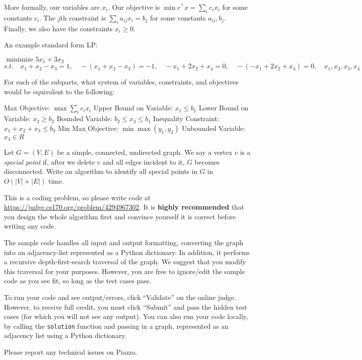 \documentclass{article}
\begin{document}
More formally, our variables are $x_i$. Our objective is $\min c^\top x = \sum_i c_i x_i$ for some constants $c_i$. The $j$th constraint is  $\sum_i a_{ij} x_i = b_j$ for some constants $a_{ij}, b_j$. Finally, we also have the constraints $x_i \geq 0$.

An example standard form LP: 
\begin{center}
$\mbox{ minimize } 5x_1 + 3x_2$\\
$s.t.\quad x_1 + x_2 - x_3 = 1, \quad -(x_1 + x_2 - x_3) = -1, \quad -x_1 + 2x_2 + x_4 = 0, \quad -(-x_1 + 2x_2 + x_4) = 0, \quad x_1, x_2, x_3, x_4 \ge 0$
\end{center} 

For each of the subparts, what system of variables, constraints, and objectives would be equivalent to the following:
\begin{subparts}
  \subpart Max Objective: $\max \sum_i c_i x_i$
  \subpart Upper Bound on Variable: $x_1 \leq b_1$
  \subpart Lower Bound on Variable: $x_2 \geq b_2$
  \subpart Bounded Variable: $b_2 \leq x_3 \leq b_1$
  \subpart Inequality Constraint: $x_1 + x_2 + x_3 \leq b_3$
  \subpart Min Max Objective: $\min \max (y_1,y_2)$
  \subpart Unbounded Variable: $x_4 \in R$
\end{subparts}


Let $G=(V, E)$ be a simple, connected, undirected graph. We say a vertex $v$ is a \emph{special point} if, after we delete $v$ and all edges incident to it, $G$ becomes disconnected. Write an algorithm to identify all special points in $G$ in $O(|V|+|E|)$ time. 

This is a coding problem, so please write code at \url{https://judge.cs170.org/problem/4294967302}. It is \textbf{highly
recommended} that you design the whole algorithm first and convince yourself it is correct
before writing any code.

The sample code handles all input and output formatting, converting the graph into an adjacency-list represented as a Python dictionary. In addition, it performs a recursive depth-first-search traversal of the graph. We suggest that you modify this traversal for your purposes. However, you are free to ignore/edit the sample code as you see fit, so long as the test cases pass.

To run your code and see output/errors, click ``Validate'' on the online judge. However, to receive full credit, you must click ``Submit'' and pass the hidden test cases (for which you will not see any output). You can also run your code locally, by calling the \verb|solution| function and passing in a graph, represented as an adjacency list using a Python dictionary.

Please report any technical issues on Piazza. 
\end{document}
